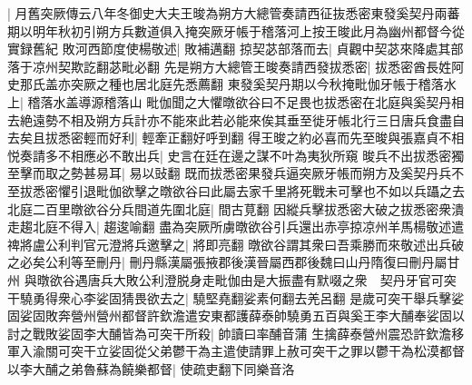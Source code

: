 |{
	月舊突厥傳云八年冬御史大夫王晙為朔方大總管奏請西征抜悉密東發奚契丹兩蕃期以明年秋初引朔方兵數道俱入掩突厥牙帳于稽落河上按王晙此月為幽州都督今從實録舊紀}
敗河西節度使楊敬述|{
	敗補邁翻}
掠契苾部落而去|{
	貞觀中契苾來降處其部落于凉州契欺訖翻苾毗必翻}
先是朔方大總管王晙奏請西發拔悉密|{
	拔悉密酋長姓阿史那氏盖亦突厥之種也居北庭先悉薦翻}
東發奚契丹期以今秋掩毗伽牙帳于稽落水上|{
	稽落水盖導源稽落山}
毗伽聞之大懼暾欲谷曰不足畏也拔悉密在北庭與奚契丹相去絶遠勢不相及朔方兵計亦不能來此若必能來俟其垂至徙牙帳北行三日唐兵食盡自去矣且拔悉密輕而好利|{
	輕牽正翻好呼到翻}
得王晙之約必喜而先至晙與張嘉貞不相悦奏請多不相應必不敢出兵|{
	史言在廷在邊之謀不叶為夷狄所窺}
晙兵不出拔悉密獨至擊而取之勢甚易耳|{
	易以䜴翻}
既而拔悉密果發兵逼突厥牙帳而朔方及奚契丹兵不至拔悉密懼引退毗伽欲擊之暾欲谷曰此屬去家千里將死戰未可擊也不如以兵躡之去北庭二百里暾欲谷分兵間道先圍北庭|{
	間古莧翻}
因縱兵擊拔悉密大破之拔悉密衆潰走趨北庭不得入|{
	趨逡喻翻}
盡為突厥所虜暾欲谷引兵還出赤亭掠凉州羊馬楊敬述遣禆將盧公利判官元澄將兵邀擊之|{
	將即亮翻}
暾欲谷謂其衆曰吾乘勝而來敬述出兵破之必矣公利等至刪丹|{
	刪丹縣漢屬張掖郡後漢晉屬西郡後魏曰山丹隋復曰刪丹屬甘州}
與暾欲谷遇唐兵大敗公利澄脱身走毗伽由是大振盡有默啜之衆　契丹牙官可突干驍勇得衆心李娑固猜畏欲去之|{
	驍堅堯翻娑素何翻去羌呂翻}
是歲可突干舉兵擊娑固娑固敗奔營州營州都督許欽澹遣安東都護薛泰帥驍勇五百與奚王李大酺奉娑固以討之戰敗娑固李大酺皆為可突干所殺|{
	帥讀曰率酺音蒲}
生擒薛泰營州震恐許欽澹移軍入渝關可突干立娑固從父弟鬱干為主遣使請罪上赦可突干之罪以鬱干為松漠都督以李大酺之弟魯蘇為饒樂都督|{
	使疏吏翻下同樂音洛}



